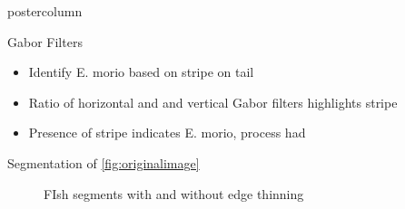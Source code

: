 \documentclass[final]{beamer}
\begin{document}
\begin{frame}
\begin{columns}
\begin{column}{.33\textwidth}
\begin{beamercolorbox}[center,wd=\textwidth]{postercolumn}
\begin{minipage}[T]{.95\textwidth}
{            \vfill
            \begin{block}{Gabor Filters}
              \begin{itemize}
              \item Identify E. morio based on stripe on tail
              \item Ratio of horizontal and and vertical Gabor filters highlights stripe
              \item Presence of stripe indicates E. morio, process had 
              \end{itemize}              
            \end{block}
            \vfill
            \begin{block}{Segmentation of \ref{fig:originalimage}}
             \begin{figure}
               \centering
               \caption{FIsh segments with and without edge thinning}
               

\end{figure}
\end{block}}
\end{minipage}
\end{beamercolorbox}
\end{column}
\end{columns}
\end{frame}
\end{document}
